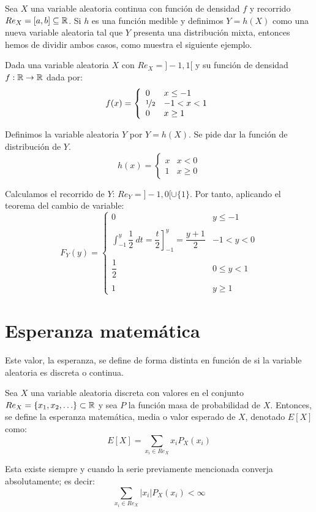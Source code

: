 Sea $X$ una variable aleatoria continua con función de densidad $f$ y recorrido $Re_X=[a,b]\subseteq \mathbb R$. Si $h$ es una función medible y definimos $Y=h(X)$ como una nueva variable aleatoria tal que $Y$ presenta una distribución mixta, entonces hemos de dividir ambos casos, como muestra el siguiente ejemplo.
\begin{ejemplo}
    Dada una variable aleatoria $X$ con $Re_X = ]-1, 1[$ y su función de densidad $f:\mathbb R \rightarrow \mathbb R$ dada por:
    $$f(x) = \left\{ \begin{array}{ll}
        0           & x \leq -1  \\
        \nicefrac{1}{2} & -1 < x < 1 \\
        0           & x \geq 1
    \end{array} \right. $$

    Definimos la variable aleatoria $Y$ por $Y=h(X)$. Se pide dar la función de distribución de $Y$.
    $$h(x) = \left\{ \begin{array}{ll}
        x & x < 0    \\
        1 & x \geq 0
    \end{array} \right.$$

        
    Calculamos el recorrido de $Y$: $Re_Y = ]-1, 0[ \cup \{1\}$. Por tanto, aplicando el teorema del cambio de variable:
    $$F_Y(y) = \left\{ \begin{array}{cl}
        0 & y \leq -1    \\ \\
        \displaystyle\int_{-1}^y \dfrac{1}{2}~dt = \left. \dfrac{t}{2} \right]_{-1}^y = \dfrac{y+1}{2} & -1 < y < 0   \\ \\
        \dfrac{1}{2} & 0 \leq y < 1 \\ \\
        1 & y \geq 1
  \end{array} \right.$$
\end{ejemplo}

\section{Esperanza matemática}

Este valor, la esperanza, se define de forma distinta en función de si la variable aleatoria es discreta o continua.
\begin{definicion}
    Sea $X$ una variable aleatoria discreta con valores en el conjunto $Re_X = \{x_1, x_2, \ldots\} \subset \mathbb R$ y sea $P$ la función masa de probabilidad de $X$. Entonces, se define la esperanza matemática, media o valor esperado de $X$, denotado $E[X]$ como:
    $$E[X] = \sum\limits_{x_i \in Re_X} x_i P_X(x_i)$$

    Esta existe siempre y cuando la serie previamente mencionada converja absolutamente; es decir:
    $$\sum\limits_{x_i \in Re_X} |x_i| P_X(x_i) < \infty$$
\end{definicion}

